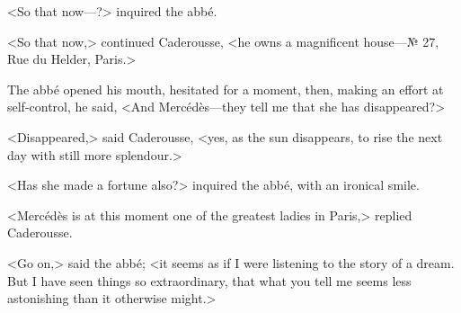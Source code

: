  <So that now—?> inquired the abbé. 

 <So that now,> continued Caderousse, <he owns a magnificent house—№ 27, Rue du Helder, Paris.> 

 The abbé opened his mouth, hesitated for a moment, then, making an effort at self-control, he said, <And Mercédès—they tell me that she has disappeared?> 

 <Disappeared,> said Caderousse, <yes, as the sun disappears, to rise the next day with still more splendour.> 

 <Has she made a fortune also?> inquired the abbé, with an ironical smile. 

 <Mercédès is at this moment one of the greatest ladies in Paris,> replied Caderousse. 

 <Go on,> said the abbé; <it seems as if I were listening to the story of a dream. But I have seen things so extraordinary, that what you tell me seems less astonishing than it otherwise might.> 

